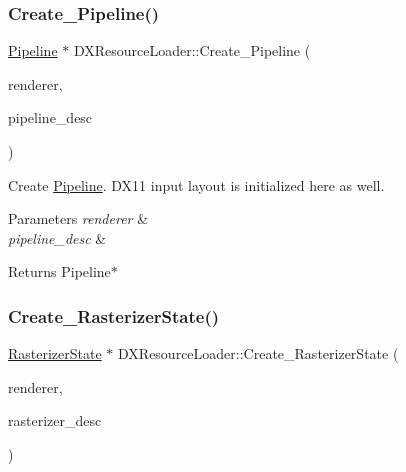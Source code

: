 \subsubsection{\texorpdfstring{Create\+\_\+\+Pipeline()}{Create\_Pipeline()}}
{\footnotesize\ttfamily \hyperlink{classPipeline}{Pipeline} $\ast$ D\+X\+Resource\+Loader\+::\+Create\+\_\+\+Pipeline (\begin{DoxyParamCaption}\item[{\hyperlink{classDXRenderer}{D\+X\+Renderer} $\ast$}]{renderer,  }\item[{const \hyperlink{structPipelineDesc}{Pipeline\+Desc} \&}]{pipeline\+\_\+desc }\end{DoxyParamCaption})\hspace{0.3cm}{\ttfamily [static]}}



Create \hyperlink{classPipeline}{Pipeline}. D\+X11 input layout is initialized here as well. 


\begin{DoxyParams}{Parameters}
{\em renderer} & \\
\hline
{\em pipeline\+\_\+desc} & \\
\hline
\end{DoxyParams}
\begin{DoxyReturn}{Returns}
Pipeline$\ast$ 
\end{DoxyReturn}
\mbox{\label{classDXResourceLoader_a3c7d160030a87f4973a9c2ec1893188f}} 
\subsubsection{\texorpdfstring{Create\+\_\+\+Rasterizer\+State()}{Create\_RasterizerState()}}
{\footnotesize\ttfamily \hyperlink{classRasterizerState}{Rasterizer\+State} $\ast$ D\+X\+Resource\+Loader\+::\+Create\+\_\+\+Rasterizer\+State (\begin{DoxyParamCaption}\item[{\hyperlink{classDXRenderer}{D\+X\+Renderer} $\ast$}]{renderer,  }\item[{const \hyperlink{structRasterizerStateDesc}{Rasterizer\+State\+Desc} \&}]{rasterizer\+\_\+desc }\end{DoxyParamCaption})\hspace{0.3cm}{\ttfamily [static]}}



